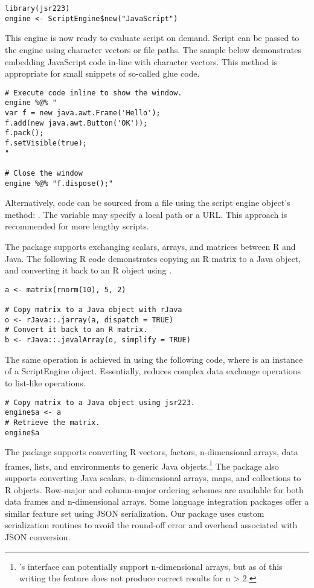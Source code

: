 \begin{verbatim}
library(jsr223)
engine <- ScriptEngine$new("JavaScript")
\end{verbatim}
This engine is now ready to evaluate script on demand. Script can be passed to the engine using character vectors or file paths. The sample below demonstrates embedding JavaScript code in-line with character vectors. This method is appropriate for small snippets of so-called glue code. 

\begin{verbatim}
# Execute code inline to show the window.
engine %@% "
var f = new java.awt.Frame('Hello');
f.add(new java.awt.Button('OK'));
f.pack();
f.setVisible(true);
"

# Close the window
engine %@% "f.dispose();"
\end{verbatim}
Alternatively, code can be sourced from a file using the script engine object's  method: . The variable  may specify a local path or a URL. This approach is recommended for more lengthy scripts.

The  package supports exchanging scalars, arrays, and matrices between R and Java. The following R code demonstrates copying an R matrix to a Java object, and converting it back to an R object using .

\begin{verbatim}
a <- matrix(rnorm(10), 5, 2)

# Copy matrix to a Java object with rJava
o <- rJava::.jarray(a, dispatch = TRUE)
# Convert it back to an R matrix.
b <- rJava::.jevalArray(o, simplify = TRUE)
\end{verbatim}
The same operation is achieved in  using the following code, where  is an instance of a  ScriptEngine object. Essentially,  reduces complex data exchange operations to list-like operations.

\begin{verbatim}
# Copy matrix to a Java object using jsr223.
engine$a <- a
# Retrieve the matrix.
engine$a
\end{verbatim}
The  package supports converting R vectors, factors, n-dimensional arrays, data frames, lists, and environments to generic Java objects.\footnote{'s interface can potentially support n-dimensional arrays, but as of this writing the feature does not produce correct results for n > 2.} The  package also supports converting Java scalars, n-dimensional arrays, maps, and collections to R objects. Row-major and column-major ordering schemes are available for both data frames and n-dimensional arrays. Some language integration packages offer a similar feature set using JSON serialization. Our package uses custom serialization routines to avoid the round-off error and overhead associated with JSON conversion.

